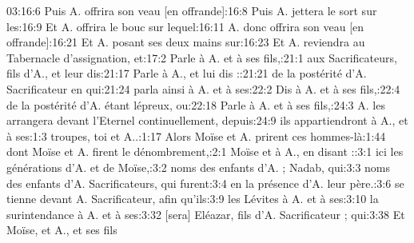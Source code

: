 \begin{multicols}{3}
{03:16:6	Puis A. offrira son veau [en offrande]:16:8	Puis A. jettera le sort sur les:16:9	Et A. offrira le bouc sur lequel:16:11	A. donc offrira son veau [en offrande]:16:21	Et A. posant ses deux mains sur:16:23	Et A. reviendra au Tabernacle d'assignation, et:17:2	Parle à A. et à ses fils,:21:1	aux Sacrificateurs, fils d'A., et leur dis:21:17	Parle à A., et lui dis ::21:21	de la postérité d'A. Sacrificateur en qui:21:24	parla ainsi à A. et à ses:22:2	Dis à A. et à ses fils,:22:4	de la postérité d'A. étant lépreux, ou:22:18	Parle à A. et à ses fils,:24:3	A. les arrangera devant l'Eternel continuellement, depuis:24:9	ils appartiendront à A., et à ses:1:3	troupes, toi et A..:1:17	Alors Moïse et A. prirent ces hommes-là:1:44	dont Moïse et A. firent le dénombrement,:2:1	Moïse et à A., en disant ::3:1	ici les générations d'A. et de Moïse,:3:2	noms des enfants d'A. ; Nadab, qui:3:3	noms des enfants d'A. Sacrificateurs, qui furent:3:4	en la présence d'A. leur père.:3:6	se tienne devant A. Sacrificateur, afin qu'ils:3:9	les Lévites à A. et à ses:3:10	la surintendance à A. et à ses:3:32	[sera] Eléazar, fils d'A. Sacrificateur ; qui:3:38	Et Moïse, et A., et ses fils\newline
}
\end{multicols}
